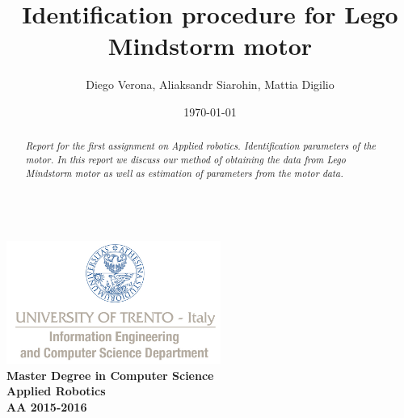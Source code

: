 \documentclass[a4paper,12pt,oneside]{article}
\title{Identification procedure for Lego Mindstorm motor}
\author{Diego Verona, Aliaksandr Siarohin, Mattia Digilio}
\date{\today}
\begin{document}
\makeatletter  %
\begin{titlepage}
      \centering
      ~~~~~~~~~~~~~\\[-30mm]
      \includegraphics[keepaspectratio=true, width=7cm]{bg_eng_1r.jpg} \\[10mm]

     {
     \large \bfseries Master Degree in Computer Science\\[3mm] 
     Applied Robotics\\[3mm]
     AA 2015-2016
     }\\[10mm]


     \vspace{0.5cm}
     {
     \Large \bfseries \textcolor{blue}{\@title} \par
     }
     \vspace{0.5cm}
     \vspace{0.2cm}

     {\large {\@author}}
     \\ \vspace{.2cm}
     \@date

     \vspace{0.6cm}


\begin{abstract}

\textit{
  Report for the first assignment on Applied robotics. Identification parameters of the motor. In this report we discuss our method of obtaining the data from Lego Mindstorm motor as well as estimation of parameters from the motor  data.
}


\end{abstract}

\end{titlepage}
\end{document}
